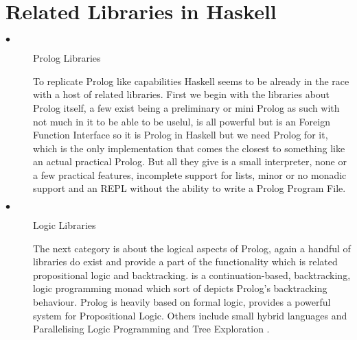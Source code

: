 \documentclass[thesis-solanki.tex]{subfiles}
\begin{document}
\section{Related Libraries in Haskell}
\begin{description}
\item[$\bullet$]Prolog Libraries

To replicate Prolog like capabilities Haskell seems to be already in the race with a host of related libraries. First we begin with the libraries about Prolog itself, a few exist \cite{nanoprolog-lib} being a preliminary or mini Prolog as such with not much in it to be able to be uselul, \cite{hswip-lib} is all powerful but is an Foreign Function Interface so it is Prolog in Haskell but we need Prolog for it, \cite{prolog-lib} which is the only implementation that comes the closest to something like an actual practical Prolog. But all they give is a small interpreter, none or a few practical features, incomplete support for lists, minor or no monadic support and an REPL without the ability to write a Prolog Program File.

\begin{comment}
\begin{enumerate}
	\item Nano Prolog
	\item Prolog
	\item cspm-To-Prolog
	\item prolog-graph and prolog-graph-lib
	\item hswip,
	\\* \url{https://groups.google.com/forum/#!topic/haskell-cafe/3vmCuw7NlWE}
\end{enumerate}
\end{comment}

\item[$\bullet$]Logic Libraries

The next category is about the logical aspects of Prolog, again a handful of libraries do exist and provide a part
of the functionality which is related propositional logic and backtracking. \cite{logict-lib} is a
continuation-based, backtracking, logic programming monad which sort of depicts Prolog's backtracking
behaviour. Prolog is heavily based on formal logic, \cite{proplogic-lib} provides a powerful system for
Propositional Logic. Others include small hybrid languages \cite{cflp-lib} and Parallelising Logic Programming
and Tree Exploration \cite{logic-grows-on-trees-lib}.


\end{description}
\end{document}
